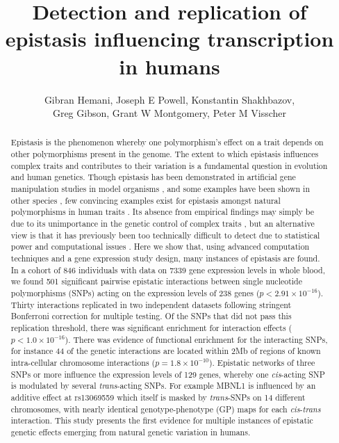 \documentclass{article}
\title{Detection and replication of epistasis influencing transcription in humans}
\date{}
\author{Gibran Hemani, Joseph E Powell, Konstantin Shakhbazov, \\
Greg Gibson, Grant W Montgomery, Peter M Visscher}
\begin{document}
\maketitle


\begin{abstract}
Epistasis is the phenomenon whereby one polymorphism's effect on a trait depends on other polymorphisms present in the genome. The extent to which epistasis influences complex traits \cite{Carlborg2004} and contributes to their variation \cite{Hill2008a, Crow2010} is a fundamental question in evolution and human genetics. Though epistasis has been demonstrated in artificial gene manipulation studies in model organisms \cite{Costanzo2010, Bloom2013}, and some examples have been shown in other species \cite{Carlborg2006}, few convincing examples exist for epistasis amongst natural polymorphisms in human traits \cite{Strange2010, Evans2011}. Its absence from empirical findings may simply be due to its unimportance in the genetic control of complex traits \cite{Hill2008a, Crow2010}, but an alternative view is that it has previously been too technically difficult to detect due to statistical power and computational issues \cite{Cordell2009}. Here we show that, using advanced computation techniques \cite{Hemani2011} and a gene expression study design, many instances of epistasis are found. In a cohort of 846 individuals with data on 7339 gene expression levels in whole blood, we found 501 significant pairwise epistatic interactions between single nucleotide polymorphisms (SNPs) acting on the expression levels of 238 genes ($p < 2.91 \times 10^{-16}$). Thirty interactions replicated in two independent datasets \cite{Metspalu2004, Fehrmann2011} following stringent Bonferroni correction for multiple testing. Of the SNPs that did not pass this replication threshold, there was significant enrichment for interaction effects ($p < 1.0 \times 10^{-16}$). There was evidence of functional enrichment for the interacting SNPs, for instance 44 of the genetic interactions are located within 2Mb of regions of known intra-cellular chromosome interactions \cite{Lieberman-Aiden2009} ($p = 1.8 \times 10^{-10}$). Epistatic networks of three SNPs or more influence the expression levels of 129 genes, whereby one \emph{cis}-acting SNP is modulated by several \emph{trans}-acting SNPs. For example MBNL1 is influenced by an additive effect at rs13069559 which itself is masked by \emph{trans}-SNPs on 14 different chromosomes, with nearly identical genotype-phenotype (GP) maps for each \emph{cis}-\emph{trans} interaction. This study presents the first evidence for multiple instances of epistatic genetic effects emerging from natural genetic variation in humans.

\end{abstract}
\end{document}
